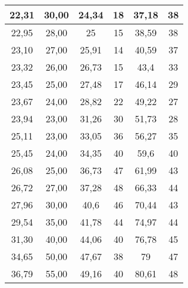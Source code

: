 \documentclass[a4paper, 12pt]{article}
\begin{document}
\begin{longtable}{|c|c|c|c|c|c|}
22,31          & 30,00           & 24,34              & 18                 & 37,18              & 38                 \\ \hline
22,95          & 28,00           & 25                 & 15                 & 38,59              & 38                 \\ \hline
23,10          & 27,00           & 25,91              & 14                 & 40,59              & 37                 \\ \hline
23,32          & 26,00           & 26,73              & 15                 & 43,4               & 33                 \\ \hline
23,45          & 25,00           & 27,48              & 17                 & 46,14              & 29                 \\ \hline
23,67          & 24,00           & 28,82              & 22                 & 49,22              & 27                 \\ \hline
23,94          & 23,00           & 31,26              & 30                 & 51,73              & 28                 \\ \hline
25,11          & 23,00           & 33,05              & 36                 & 56,27              & 35                 \\ \hline
25,45          & 24,00           & 34,35              & 40                 & 59,6               & 40                 \\ \hline
26,08          & 25,00           & 36,73              & 47                 & 61,99              & 43                 \\ \hline
26,72          & 27,00           & 37,28              & 48                 & 66,33              & 44                 \\ \hline
27,96          & 30,00           & 40,6               & 46                 & 70,44              & 43                 \\ \hline
29,54          & 35,00           & 41,78              & 44                 & 74,97              & 44                 \\ \hline
31,30          & 40,00           & 44,06              & 40                 & 76,78              & 45                 \\ \hline
34,65          & 50,00           & 47,67              & 38                 & 79                 & 47                 \\ \hline
36,79          & 55,00           & 49,16              & 40                 & 80,61              & 48                 \\ \hline

\end{longtable}
\end{document}
